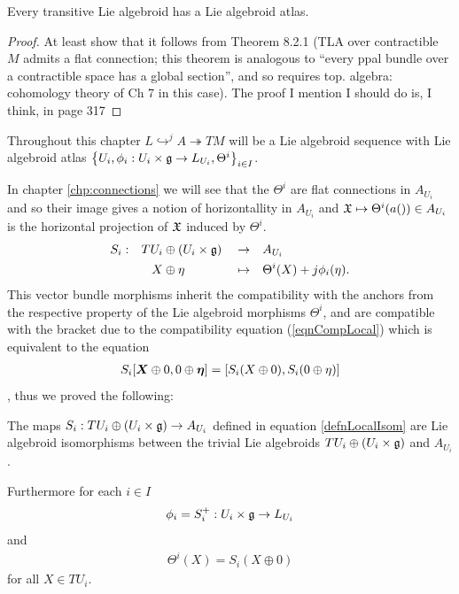 \begin{theorem}
Every transitive Lie algebroid has a Lie algebroid atlas.
\end{theorem}
\begin{proof}
At least show that it follows from Theorem 8.2.1 (TLA over contractible $M$ admits a flat connection; this theorem is analogous to ``every ppal bundle over a contractible space has a global section'', and so requires top. algebra: cohomology theory of Ch 7 in this case). The proof I mention I should do is, I think, in page 317
\end{proof}

Throughout this chapter $L \hookrightarrow^j A \twoheadrightarrow TM$ will be a Lie algebroid sequence with Lie algebroid atlas $\set{U_i, \phi_i:U_i \times \alg g\to L_{U_i}, \Theta^i}_{i \in I}$.

In chapter \ref{chp:connections} we will see that the $\Theta^i$ are flat connections in $A_{U_i}$ and so their image gives a notion of horizontallity in $A_{U_i}$ and $ \mathfrak{X} \mapsto \Theta^i(a(\mathfrak{)}) \in A_{U_i}$ is the horizontal projection of $\mathfrak{X}$ induced by $\Theta^i$.
\begin{align}\label{defnLocalIsom}
    S_i:&& TU_i &\oplus (U_i \times \alg g) &&\to&& A_{U_i}\\
        && X &\oplus \eta && \mapsto && \Theta^i(X) + j\phi_i(\eta).
\end{align}
This vector bundle morphisms inherit the compatibility with the anchors from the respective property of the Lie algebroid morphisms $\Theta^i$, and are compatible with the bracket due to the compatibility equation (\ref{eqnCompLocal}) which is equivalent to the equation
\begin{align*}
    S_i[\bm{X} \oplus 0, 0 \oplus \bm{\eta}] = [S_i(X \oplus 0), S_i(0 \oplus \eta)]
\end{align*}, thus we proved the following:

\begin{theorem}
The maps $S_i : TU_i \oplus (U_i \times \mathfrak{g}) \to A_{U_i}$ defined in equation \ref{defnLocalIsom} are Lie algebroid isomorphisms between the trivial Lie algebroids $TU_i \oplus (U_i \times \mathfrak{g})$ and $A_{U_i}$.

Furthermore for each $i \in I$ 
\begin{align*}
    \phi_i = S_i^+: U_i \times \alg g \to L_{U_i}
\end{align*} and 
\begin{align*}
    \Theta^i(X) = S_i(X \oplus 0)
\end{align*}
for all $X \in TU_i$.
\end{theorem}


